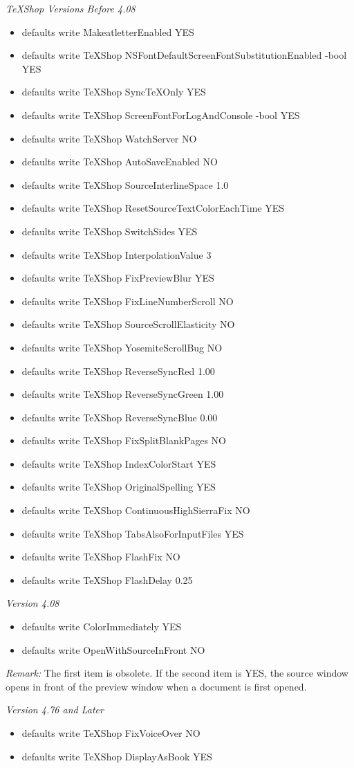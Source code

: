 \documentclass[11pt, oneside]{article}   	%
\begin{document}
\newpage
{\em TeXShop Versions Before 4.08}
\begin{itemize}
\item defaults write MakeatletterEnabled YES
\item defaults write TeXShop NSFontDefaultScreenFontSubstitutionEnabled -bool YES
\item defaults write TeXShop SyncTeXOnly YES
\item defaults write TeXShop ScreenFontForLogAndConsole -bool YES
\item defaults write TeXShop WatchServer NO
\item defaults write TeXShop AutoSaveEnabled NO
\item defaults write TeXShop SourceInterlineSpace 1.0
\item defaults write TeXShop ResetSourceTextColorEachTime YES
\item defaults write TeXShop SwitchSides YES
\item defaults write TeXShop InterpolationValue 3
\item defaults write TeXShop FixPreviewBlur YES
\item defaults write TeXShop FixLineNumberScroll NO
\item defaults write TeXShop SourceScrollElasticity NO
\item defaults write TeXShop YosemiteScrollBug NO
\item defaults write TeXShop ReverseSyncRed 1.00 
\item defaults write TeXShop ReverseSyncGreen 1.00 
\item defaults write TeXShop ReverseSyncBlue 0.00
\item defaults write TeXShop FixSplitBlankPages NO
\item defaults write TeXShop IndexColorStart YES
\item defaults write TeXShop OriginalSpelling YES
\item defaults write TeXShop ContinuousHighSierraFix NO
\item defaults write TeXShop TabsAlsoForInputFiles YES
\item defaults write TeXShop FlashFix NO
\item defaults write TeXShop FlashDelay 0.25
\end{itemize}

\newpage
{\em Version 4.08}
\begin{itemize}
\item defaults write ColorImmediately YES
\item defaults write OpenWithSourceInFront NO
\end{itemize}
\vspace{.2in}
{\em Remark:}  The first item is obsolete. If the second item is YES, the source window opens in front of the preview window when a document is first opened. 


\vspace{.3in}
{\em Version 4.76 and Later}

\begin{itemize}
\item defaults write TeXShop FixVoiceOver NO
\item defaults write TeXShop DisplayAsBook YES
\end{itemize}
\end{document}
